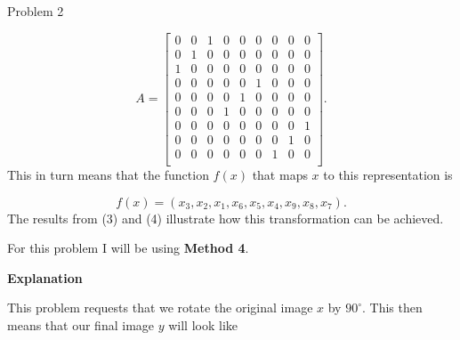 \begin{problem}{Problem 2}
\begin{highlight}
        \begin{equation}
            A =
            \begin{bmatrix}
                0 & 0 & 1 & 0 & 0 & 0 & 0 & 0 & 0 \\
                0 & 1 & 0 & 0 & 0 & 0 & 0 & 0 & 0 \\
                1 & 0 & 0 & 0 & 0 & 0 & 0 & 0 & 0 \\
                0 & 0 & 0 & 0 & 0 & 1 & 0 & 0 & 0 \\
                0 & 0 & 0 & 0 & 1 & 0 & 0 & 0 & 0 \\
                0 & 0 & 0 & 1 & 0 & 0 & 0 & 0 & 0 \\
                0 & 0 & 0 & 0 & 0 & 0 & 0 & 0 & 1 \\
                0 & 0 & 0 & 0 & 0 & 0 & 0 & 1 & 0 \\
                0 & 0 & 0 & 0 & 0 & 0 & 1 & 0 & 0 \\
            \end{bmatrix}.
        \end{equation}
        This in turn means that the function $f(x)$ that maps $x$ to this representation is 

        \begin{equation}
            f(x) = (x_{3},x_{2},x_{1},x_{6},x_{5},x_{4},x_{9},x_{8},x_{7}).
        \end{equation}
        The results from (3) and (4) illustrate how this transformation can be achieved.
    \end{highlight}

    \begin{highlight}
        For this problem I will be using \textbf{Method 4}. \vspace*{1em}

        \noindent \textbf{Explanation} \vspace*{1em}

        This problem requests that we rotate the original image $x$ by $90^{\circ}$. This then means that our final image $y$ will look like


\end{highlight}
\end{problem}
